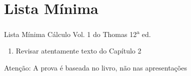 \documentclass[fleqn,utf8,aspectratio=169,12pt]{beamer}
\begin{document}
\section{Lista Mínima}

\begin{frame}{Lista Mínima}
  Cálculo Vol. 1 do Thomas 12\textsuperscript{a} ed.
  \begin{enumerate}
    \item Revisar atentamente texto do Capítulo 2
  \end{enumerate}
  \vfill
  Atenção: A prova é baseada no livro, não nas apresentações
\end{frame}

\end{document}
